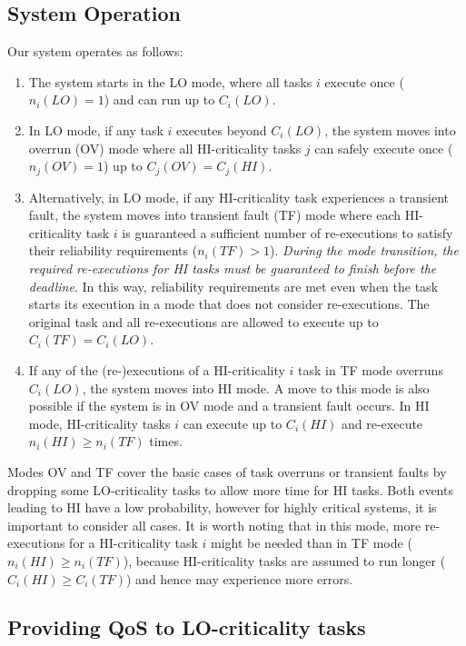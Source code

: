 \documentclass[conference]{IEEEtran}
\begin{document}
\subsection{System Operation}
Our system operates as follows:
\begin{enumerate}[topsep=-5pt]
\item  The system starts in the LO mode, where all tasks $i$ execute once ($n_i(LO)=1$) and can run up to $C_i(LO)$.
\item  In LO mode, if any task $i$ executes beyond $C_i(LO)$, the system moves into overrun (OV) mode where all HI-criticality tasks $j$ can safely execute once ($n_j(OV)=1$) up to $C_j(OV) = C_j(HI)$.
\item  Alternatively, in LO mode, if any HI-criticality task experiences a transient fault, the system moves into transient fault (TF) mode where each HI-criticality task $i$ is guaranteed a sufficient number of re-executions to satisfy their reliability requirements ($n_i(TF)>1$). {\it During the mode transition, the required re-executions for HI tasks must be guaranteed to finish before the deadline}. In this way, reliability requirements are met even when the task starts its execution in a mode that does not consider re-executions. The original task and all re-executions are allowed to execute up to $C_i(TF) = C_i(LO)$.
\item  If any of the (re-)executions of a HI-criticality $i$ task in TF mode overruns $C_i(LO)$, the system moves into HI mode. A move to this mode is also possible if the system is in OV mode and a transient fault occurs. In HI mode, HI-criticality tasks $i$ can execute up to $C_i(HI)$ and re-execute $n_i(HI) \ge n_i(TF)$ times.
\end{enumerate}

Modes OV and TF cover the basic cases of task overruns or transient faults by dropping some LO-criticality tasks to allow more time for HI tasks. Both events leading to HI have a low probability, however for highly critical systems, it is important to consider all cases. It is worth noting that in this mode, more re-executions for a HI-criticality task $i$ might be needed than in TF mode ($n_i(HI) \ge n_i(TF)$), because HI-criticality tasks are assumed to run longer ($C_i(HI) \ge C_i(TF)$) and hence may experience more errors.

\subsection{Providing QoS to LO-criticality tasks}
\end{document}
